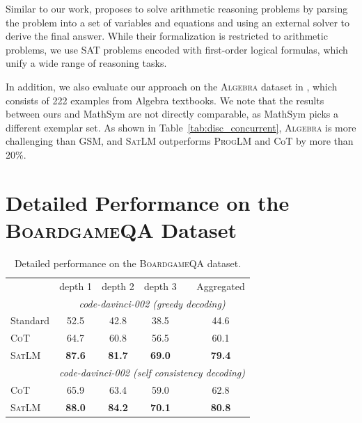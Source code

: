 \documentclass{article}
\theoremstyle{definition}
\newcommand{\gsm}{\textsc{GSM}}
\newcommand{\algebra}{\textsc{Algebra}}
\newcommand{\boardgame}{\textsc{BoardgameQA}}
\newcommand{\cotlm}{\textsc{CoT}}
\newcommand{\satlm}{\textsc{SatLM}}
\newcommand{\pallm}{\textsc{ProgLM}}
\begin{document}
Similar to our work, \cite{gsmsat} proposes to solve arithmetic reasoning problems by parsing the problem into a set of variables and equations and using an external solver to derive the final answer. While their formalization is restricted to arithmetic problems, we use SAT problems encoded with first-order logical formulas, which unify a wide range of reasoning tasks.

In addition, we also evaluate our approach on the \algebra{} dataset in \cite{gsmsat}, which consists of 222 examples from Algebra textbooks. We note that the results between ours and {\sc MathSym} are not directly comparable, as {\sc MathSym} picks a different exemplar set. As shown in Table~\ref{tab:disc_concurrent}, \algebra{} is more challenging than \gsm{}, and \satlm{} outperforms \pallm{} and {\sc CoT} by more than 20\%.

\section{Detailed Performance on the \boardgame{} Dataset}
\label{app:boardgame_breakdown}

\begin{table}[h]
    \centering
        \caption{Detailed performance on the \boardgame{} dataset.}
                \vspace{0.5em}
        \label{tab:boardgame_detail}
    \begin{tabular}{lccccc}

    \toprule
         & \sc depth 1 & \sc depth 2 & \sc depth 3 & & \sc Aggregated \\
        \cmidrule{2-4}\cmidrule{6-6}
    & \multicolumn{5}{c}{\it \footnotesize code-davinci-002 (greedy decoding)}\vspace{0.05in}\\
    \sc Standard & 52.5	& 42.8& 38.5 &&	44.6\\
        \cotlm{} & 64.7	& 60.8&56.5	& &60.1 \\
        \satlm{} & \bf 87.6	& \bf 81.7 & \bf 69.0 && \bf 79.4\\ 
                \cmidrule{2-4}\cmidrule{6-6}
    & \multicolumn{5}{c}{\it \footnotesize code-davinci-002 (self consistency decoding)}\vspace{0.05in}\\
            \cotlm{} & 65.9&	63.4&	59.0&&62.8 \\
        \satlm{} & \bf 88.0 & \bf 84.2 & \bf 70.1 && \bf 80.8 \\  
        \bottomrule
    \end{tabular}
    \label{tab:my_label}
\end{table}
\end{document}
